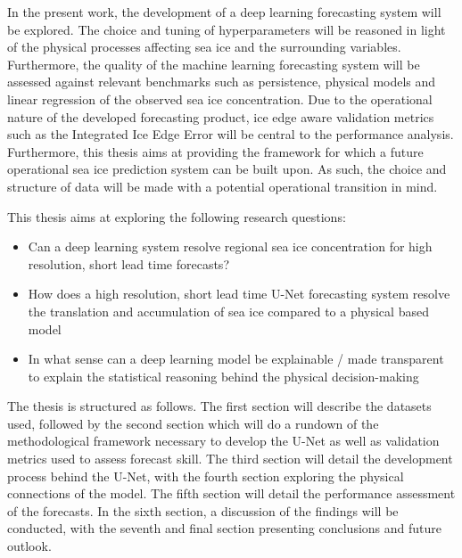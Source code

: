 \documentclass[../main/thesis.tex]{subfiles}
\begin{document}
In the present work, the development of a deep learning forecasting system will be explored. The choice and tuning of hyperparameters will be reasoned in light of the physical processes affecting sea ice and the surrounding variables. Furthermore, the quality of the machine learning forecasting system will be assessed against relevant benchmarks such as persistence, physical models and linear regression of the observed sea ice concentration. Due to the operational nature of the developed forecasting product, ice edge aware validation metrics such as the Integrated Ice Edge Error \citep{Goessling2016} will be central to the performance analysis. Furthermore, this thesis aims at providing the framework for which a future operational sea ice prediction system can be built upon. As such, the choice and structure of data will be made with a potential operational transition in mind.

This thesis aims at exploring the following research questions: 
\begin{itemize}
    \item Can a deep learning system resolve regional sea ice concentration for high resolution, short lead time forecasts? 
    \item How does a high resolution, short lead time U-Net forecasting system resolve the translation and accumulation of sea ice compared to a physical based model
    \item  In what sense can a deep learning model be explainable / made transparent to explain the statistical reasoning behind the physical decision-making
\end{itemize}

The thesis is structured as follows. The first section will describe the datasets used, followed by the second section which will do a rundown of the methodological framework necessary to develop the U-Net as well as validation metrics used to assess forecast skill. The third section will detail the development process behind the U-Net, with the fourth section exploring the physical connections of the model. The fifth section will detail the performance assessment of the forecasts. In the sixth section, a discussion of the findings will be conducted, with the seventh and final section presenting conclusions and future outlook.

\biblio
\end{document}

